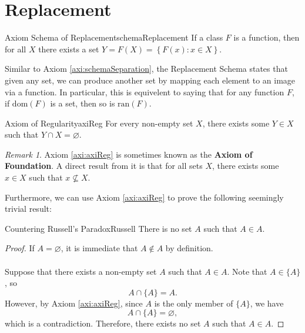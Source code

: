 \documentclass[math]{amznotes}
\theoremstyle{remark}
\newtheorem*{remark}{Remark}
\begin{document}
\section{Replacement}
\begin{axibox}{Axiom Schema of Replacement}{schemaReplacement}
    If a class $F$ is a function, then for all $X$ there exists a set $Y = F(X) = \left\{F(x) \colon x \in X\right\}$.
\end{axibox}
Similar to Axiom \ref{axi:schemaSeparation}, the Replacement Schema states that given any set, we can produce another set by mapping each element to an image via a function. In particular, this is equivelent to saying that for any function $F$, if $\mathrm{dom}(F)$ is a set, then so is $\mathrm{ran}(F)$.
\begin{axibox}{Axiom of Regularity}{axiReg}
    For every non-empty set $X$, there exists some $Y \in X$ such that $Y \cap X = \varnothing$.
\end{axibox}
\begin{notebox}
    \begin{remark}
        Axiom \ref{axi:axiReg} is sometimes known as the {\color{red} \textbf{Axiom of Foundation}}. A direct result from it is that for all sets $X$, there exists some $x \in X$ such that $x \not\subseteq X$.
    \end{remark}
\end{notebox}
Furthermore, we can use Axiom \ref{axi:axiReg} to prove the following seemingly trivial result:
\begin{thmbox}{Countering Russell's Paradox}{Russell}
    There is no set $A$ such that $A \in A$.
    \tcblower   
    \begin{proof}
        If $A = \varnothing$, it is immediate that $A \notin A$ by definition.
        \\\\
        Suppose that there exists a non-empty set $A$ such that $A \in A$. Note that $A \in \{A\}$, so 
        \begin{equation*}
            A \cap \{A\} = A.
        \end{equation*}
        However, by Axiom \ref{axi:axiReg}, since $A$ is the only member of $\{A\}$, we have 
        \begin{equation*}
            A \cap \{A\} = \varnothing,
        \end{equation*}
        which is a contradiction. Therefore, there exists no set $A$ such that $A \in A$.
    \end{proof}
\end{thmbox}
\end{document}
